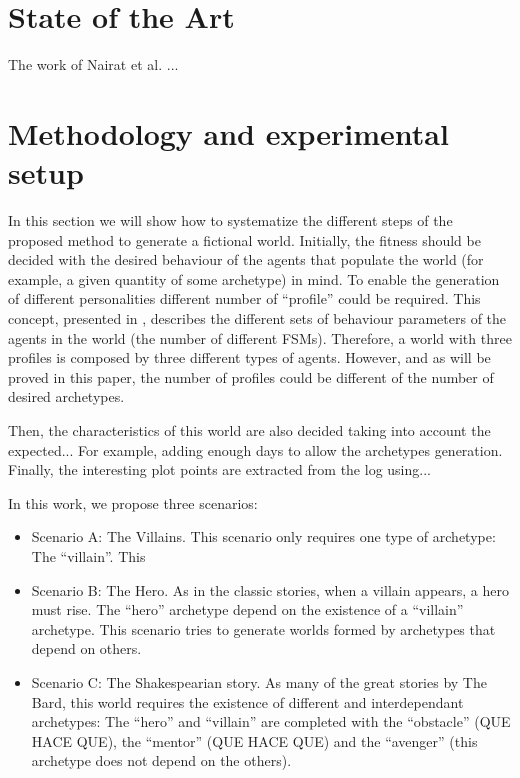\documentclass[runningheads,a4paper]{llncs}
\begin{document}
\section{State of the Art}

The work of Nairat et al. \cite{nairat:evolution} ...

\section{Methodology and experimental setup} %
\label{sec:met}

In this section we will show how to systematize the different steps
of
the proposed method to generate a fictional world. Initially, the
fitness should be decided with the desired behaviour of the
agents that populate the world (for example, a given quantity of some
archetype) in mind. To enable the generation of different
personalities %
different number of ``profile'' could be required. This concept,
presented in \cite{}, describes the different sets of behaviour
parameters of the agents in the world (the number of different
FSMs). Therefore, a world with three profiles is composed by three different
types of agents. However, and as will be proved in this paper, the
number of profiles could be different of the number of desired
archetypes. %

Then, the characteristics of this world are also decided taking into account the expected... For example, adding enough days to allow the archetypes generation. Finally, the interesting plot points are extracted from the log using... %

In this work, we propose three scenarios:
\begin{itemize}
\item Scenario A: The Villains. This scenario only requires one type of archetype: The ``villain''. This  %
\item Scenario B: The Hero. As in the classic stories, when a villain appears, a hero must rise. The ``hero'' archetype depend on the existence of a ``villain'' archetype. This scenario tries to generate worlds formed by archetypes that depend on others.
\item Scenario C: The Shakespearian story. As many of the great stories by The Bard, this world requires the existence of different and interdependant archetypes: The ``hero'' and ``villain'' are completed with the ``obstacle'' (QUE HACE QUE), the  ``mentor'' (QUE HACE QUE) and the ``avenger'' (this archetype does not depend on the others).
\end{itemize}
\end{document}
